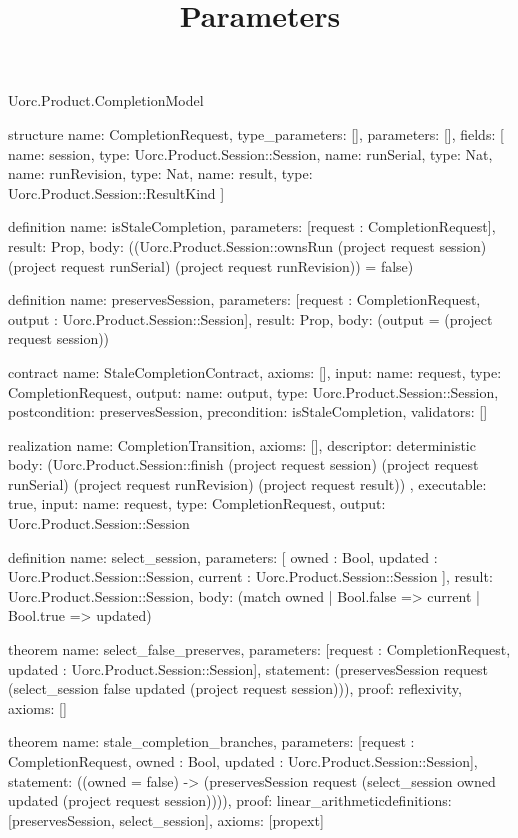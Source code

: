 \begin{lexlean}{Uorc.Product.CompletionModel}
\title{Parameters}
\begin{semanticmodule}
structure{
  name: CompletionRequest,
  type_parameters: [],
  parameters: [],
  fields: [
    {name: session, type: Uorc.Product.Session::Session},
    {name: runSerial, type: Nat},
    {name: runRevision, type: Nat},
    {name: result, type: Uorc.Product.Session::ResultKind}
  ]
}

definition{
  name: isStaleCompletion,
  parameters: [request : CompletionRequest],
  result: Prop,
  body: ((Uorc.Product.Session::ownsRun (project request session) (project request runSerial) (project request runRevision)) = false)
}

definition{
  name: preservesSession,
  parameters: [request : CompletionRequest, output : Uorc.Product.Session::Session],
  result: Prop,
  body: (output = (project request session))
}

contract{
  name: StaleCompletionContract,
  axioms: [],
  input: {name: request, type: CompletionRequest},
  output: {name: output, type: Uorc.Product.Session::Session},
  postcondition: preservesSession,
  precondition: isStaleCompletion,
  validators: []
}

realization{
  name: CompletionTransition,
  axioms: [],
  descriptor: deterministic{
    body: (Uorc.Product.Session::finish (project request session) (project request runSerial) (project request runRevision) (project request result))
  },
  executable: true,
  input: {name: request, type: CompletionRequest},
  output: Uorc.Product.Session::Session
}

definition{
  name: select_session,
  parameters: [
    owned : Bool,
    updated : Uorc.Product.Session::Session,
    current : Uorc.Product.Session::Session
  ],
  result: Uorc.Product.Session::Session,
  body: (match owned | Bool.false => current | Bool.true => updated)
}

theorem{
  name: select_false_preserves,
  parameters: [request : CompletionRequest, updated : Uorc.Product.Session::Session],
  statement: (preservesSession request (select_session false updated (project request session))),
  proof: reflexivity{},
  axioms: []
}

theorem{
  name: stale_completion_branches,
  parameters: [request : CompletionRequest, owned : Bool, updated : Uorc.Product.Session::Session],
  statement: ((owned = false) -> (preservesSession request (select_session owned updated (project request session)))),
  proof: linear_arithmetic{definitions: [preservesSession, select_session]},
  axioms: [propext]
}


\end{semanticmodule}
\end{lexlean}
